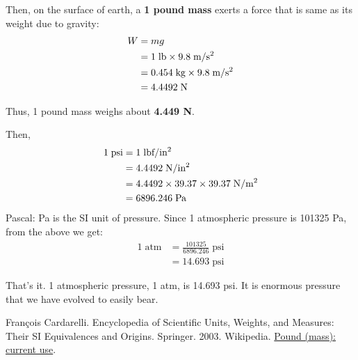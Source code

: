 \documentclass[a6paper]{article}
\begin{document}
Then, on the surface of earth, a \textbf{1 pound mass} exerts a force that is same as its weight due to gravity:
\begin{align*}
    W 
    &= mg \\
    &= 1\; \text{lb} \times 9.8\; \text{m/s\textsuperscript{2}} \\
    &= 0.454\; \text{kg} \times 9.8\; \text{m/s\textsuperscript{2}}\\
    &= 4.4492\; \text{N} 
\end{align*}

Thus, 1 pound mass weighs about \textbf{4.449 \si{\newton}}.

Then, 
\begin{align*}
    1 \; \text{psi} 
    &= 1 \; \text{lbf/in\textsuperscript{2}} \\
    &= 4.4492 \; \text{N/in\textsuperscript{2}} \\
    &= 4.4492 \times 39.37 \times 39.37\; \text{N/m\textsuperscript{2}} \\
    &= 6896.246 \; \si{\pascal}
\end{align*}
Pascal: \si{\pascal} is the SI unit of pressure. Since 1 atmospheric pressure is 101325 \si{\pascal}, from the above we get:
\begin{align*}
    1 \; \text{atm} 
    &= \frac{101325}{6896.246} \;\text{psi} \\
    &= 14.693 \; \text{psi}
\end{align*}

That's it. 1 atmospheric pressure, 1 atm, is 14.693 psi. It is enormous pressure that we have evolved to easily bear.

\begin{thebibliography}{00}
     Fran{\c c}ois Cardarelli. Encyclopedia of Scientific Units, Weights, and Measures: Their SI Equivalences and Origins. Springer. 2003.
     Wikipedia. \href{https://en.wikipedia.org/wiki/Pound\_(mass)\#Current\_use}{Pound (mass): current use}.
\end{thebibliography}
\end{document}
